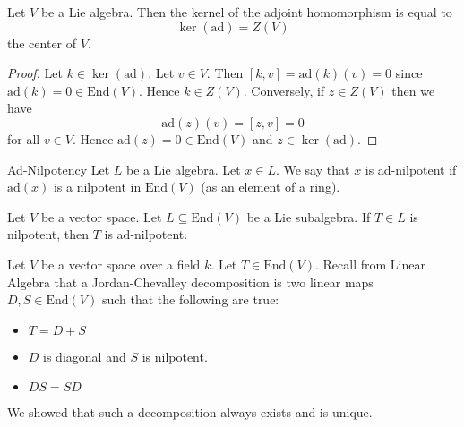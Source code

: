 \documentclass[a4paper]{article}
\begin{document}
\begin{lmm}{}{} Let $V$ be a Lie algebra. Then the kernel of the adjoint homomorphism is equal to $$\ker(\text{ad})=Z(V)$$ the center of $V$. \tcbline
\begin{proof}
Let $k\in\ker(\text{ad})$. Let $v\in V$. Then $[k,v]=\text{ad}(k)(v)=0$ since $\text{ad}(k)=0\in\text{End}(V)$. Hence $k\in Z(V)$. Conversely, if $z\in Z(V)$ then we have $$\text{ad}(z)(v)=[z,v]=0$$ for all $v\in V$. Hence $\text{ad}(z)=0\in\text{End}(V)$ and $z\in\ker(\text{ad})$. 
\end{proof}
\end{lmm}

\begin{defn}{Ad-Nilpotency}{} Let $L$ be a Lie algebra. Let $x\in L$. We say that $x$ is ad-nilpotent if $\text{ad}(x)$ is a nilpotent in $\text{End}(V)$ (as an element of a ring). 
\end{defn}

\begin{lmm}{}{} Let $V$ be a vector space. Let $L\subseteq\text{End}(V)$ be a Lie subalgebra. If $T\in L$ is nilpotent, then $T$ is ad-nilpotent. 
\end{lmm}

Let $V$ be a vector space over a field $k$. Let $T\in\text{End}(V)$. Recall from Linear Algebra that a Jordan-Chevalley decomposition is two linear maps $D,S\in\text{End}(V)$ such that the following are true: 
\begin{itemize}
\item $T=D+S$
\item $D$ is diagonal and $S$ is nilpotent. 
\item $DS=SD$
\end{itemize}
We showed that such a decomposition always exists and is unique. 
\end{document}
